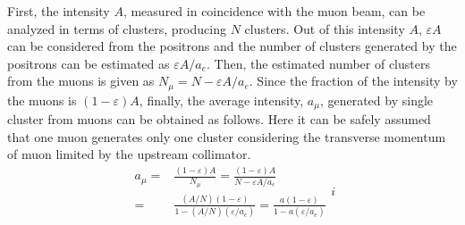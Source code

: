 \documentclass[preprint,3p,twocolumn]{elsarticle}
\begin{document}
First, the intensity $A$, measured in coincidence with the muon beam, can be analyzed in terms of clusters, producing $N$ clusters. Out of this intensity $A$, $\varepsilon A$ can be considered from the positrons and the number of clusters generated by the positrons can be estimated as $\varepsilon A/a_e$. Then, the estimated number of clusters from the muons is given as $N_\mu=N-\varepsilon A/a_e$. Since the fraction of the intensity by the muons is $(1-\varepsilon)A$, finally, the average intensity, $a_\mu$, generated by single cluster from muons can be obtained as follows. Here it can be safely assumed that one muon generates only one cluster considering the transverse momentum of muon limited by the upstream collimator.
{	\fontsize{9pt}{0}
	\setlength{\mathindent}{0pt}
	\setlength{\abovedisplayskip}{8pt}
	\setlength{\belowdisplayskip}{5pt}
	\begin{equation}
	\begin{split}
	a_\mu=&\frac{(1-\varepsilon)A}{N_\mu}=\frac{(1-\varepsilon)A}{N-\varepsilon A/a_e}\\ =&\frac{(A/N)(1-\varepsilon)}{1-(A/N)(\varepsilon/a_e)}=\frac{a(1-\varepsilon)}{1-a(\varepsilon /a_{e})}
	\end{split}
	i\end{equation}
}
\end{document}
